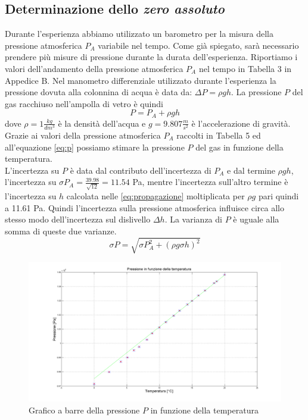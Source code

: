 \subsection{Determinazione dello \emph{zero assoluto}}
Durante l'esperienza abbiamo utilizzato un barometro per la misura della pressione atmosferica $P_A$ variabile nel tempo. 
Come già spiegato, sarà necessario prendere più misure di pressione durante la durata dell'esperienza.
Riportiamo i valori dell'andamento della pressione atmosferica $P_A$ nel tempo in Tabella 3 in Appedice B.
Nel manometro differenziale utilizzato durante l'esperienza la pressione dovuta alla colonnina di acqua è data da: $\Delta P = \rho gh$. 
La pressione $P$ del gas racchiuso nell'ampolla di vetro è quindi 
\begin{equation}
\label{eq:p}
P = P_A + \rho gh
\end{equation}
dove $\rho = 1 \frac{kg}{dm^3}$ è la densità dell'acqua e $g = 9.807 \frac{m}{s^2}$ è l'accelerazione di gravità.
Grazie ai valori della pressione atmosferica $P_A$ raccolti in Tabella 5 ed all'equazione \eqref{eq:p} possiamo stimare la pressione $P$ del gas in funzione della temperatura.\\
L'incertezza su $P$ è data dal contributo dell'incertezza di $P_A$ e dal termine $\rho gh$, l'incertezza su $\sigma P_A = \frac{39.98}{\sqrt{12}} = 11.54$ Pa, mentre l'incertezza sull'altro termine è l'incertezza su $h$ calcolata nelle \eqref{eq:propagazione} moltiplicata per $\rho g$ pari quindi a 11.61 Pa. 
Quindi l'incertezza sulla pressione atmosferica influisce circa allo stesso modo dell'incertezza sul dislivello $\Delta h$.
La varianza di $P$ è uguale alla somma di queste due varianze.
\begin{equation}
\label{eq:sigma P}
\sigma P = \sqrt{\sigma P_A^2 + (\rho g \sigma h)^2}
\end{equation}

\begin{figure}[H]
\centering
\includegraphics[width=\textwidth]{img/3}
\caption{Grafico a barre della pressione $P$ in funzione della temperatura}
\end{figure}

